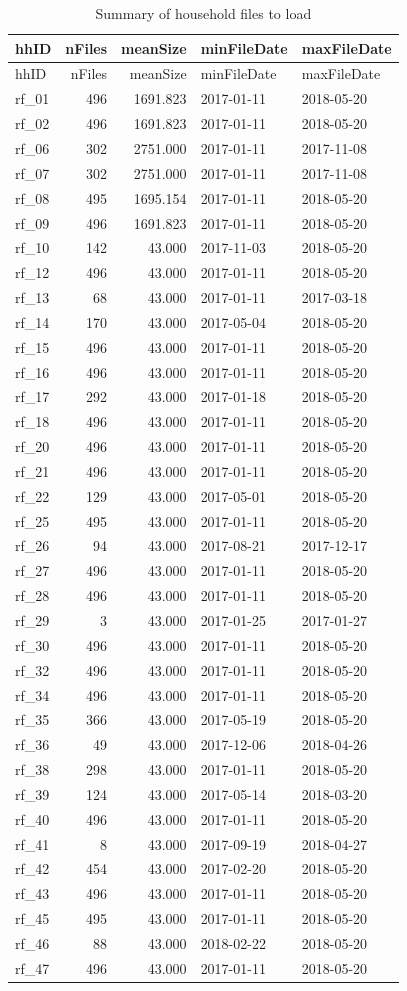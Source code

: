 \documentclass[]{article}
\begin{document}
\begin{longtable}[]{@{}lrrll@{}}
\caption{Summary of household files to load}\tabularnewline
\toprule
hhID & nFiles & meanSize & minFileDate & maxFileDate\tabularnewline
\midrule
\endfirsthead
\toprule
hhID & nFiles & meanSize & minFileDate & maxFileDate\tabularnewline
\midrule
\endhead
rf\_01 & 496 & 1691.823 & 2017-01-11 & 2018-05-20\tabularnewline
rf\_02 & 496 & 1691.823 & 2017-01-11 & 2018-05-20\tabularnewline
rf\_06 & 302 & 2751.000 & 2017-01-11 & 2017-11-08\tabularnewline
rf\_07 & 302 & 2751.000 & 2017-01-11 & 2017-11-08\tabularnewline
rf\_08 & 495 & 1695.154 & 2017-01-11 & 2018-05-20\tabularnewline
rf\_09 & 496 & 1691.823 & 2017-01-11 & 2018-05-20\tabularnewline
rf\_10 & 142 & 43.000 & 2017-11-03 & 2018-05-20\tabularnewline
rf\_12 & 496 & 43.000 & 2017-01-11 & 2018-05-20\tabularnewline
rf\_13 & 68 & 43.000 & 2017-01-11 & 2017-03-18\tabularnewline
rf\_14 & 170 & 43.000 & 2017-05-04 & 2018-05-20\tabularnewline
rf\_15 & 496 & 43.000 & 2017-01-11 & 2018-05-20\tabularnewline
rf\_16 & 496 & 43.000 & 2017-01-11 & 2018-05-20\tabularnewline
rf\_17 & 292 & 43.000 & 2017-01-18 & 2018-05-20\tabularnewline
rf\_18 & 496 & 43.000 & 2017-01-11 & 2018-05-20\tabularnewline
rf\_20 & 496 & 43.000 & 2017-01-11 & 2018-05-20\tabularnewline
rf\_21 & 496 & 43.000 & 2017-01-11 & 2018-05-20\tabularnewline
rf\_22 & 129 & 43.000 & 2017-05-01 & 2018-05-20\tabularnewline
rf\_25 & 495 & 43.000 & 2017-01-11 & 2018-05-20\tabularnewline
rf\_26 & 94 & 43.000 & 2017-08-21 & 2017-12-17\tabularnewline
rf\_27 & 496 & 43.000 & 2017-01-11 & 2018-05-20\tabularnewline
rf\_28 & 496 & 43.000 & 2017-01-11 & 2018-05-20\tabularnewline
rf\_29 & 3 & 43.000 & 2017-01-25 & 2017-01-27\tabularnewline
rf\_30 & 496 & 43.000 & 2017-01-11 & 2018-05-20\tabularnewline
rf\_32 & 496 & 43.000 & 2017-01-11 & 2018-05-20\tabularnewline
rf\_34 & 496 & 43.000 & 2017-01-11 & 2018-05-20\tabularnewline
rf\_35 & 366 & 43.000 & 2017-05-19 & 2018-05-20\tabularnewline
rf\_36 & 49 & 43.000 & 2017-12-06 & 2018-04-26\tabularnewline
rf\_38 & 298 & 43.000 & 2017-01-11 & 2018-05-20\tabularnewline
rf\_39 & 124 & 43.000 & 2017-05-14 & 2018-03-20\tabularnewline
rf\_40 & 496 & 43.000 & 2017-01-11 & 2018-05-20\tabularnewline
rf\_41 & 8 & 43.000 & 2017-09-19 & 2018-04-27\tabularnewline
rf\_42 & 454 & 43.000 & 2017-02-20 & 2018-05-20\tabularnewline
rf\_43 & 496 & 43.000 & 2017-01-11 & 2018-05-20\tabularnewline
rf\_45 & 495 & 43.000 & 2017-01-11 & 2018-05-20\tabularnewline
rf\_46 & 88 & 43.000 & 2018-02-22 & 2018-05-20\tabularnewline
rf\_47 & 496 & 43.000 & 2017-01-11 & 2018-05-20\tabularnewline
\bottomrule
\end{longtable}
\end{document}
